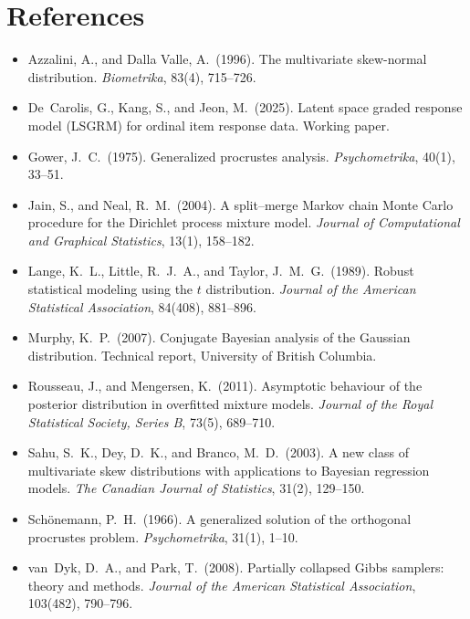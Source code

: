 \documentclass[11pt]{article}
\begin{document}
\section*{References}

\begin{itemize}[leftmargin=1.5em]
    \item Azzalini, A., and Dalla Valle, A.\ (1996).
    The multivariate skew-normal distribution.
    \emph{Biometrika}, 83(4), 715--726.

    \item De~Carolis, G., Kang, S., and Jeon, M.\ (2025).
    Latent space graded response model (LSGRM) for ordinal item response
    data.  Working paper.

    \item Gower, J.~C.\ (1975).  Generalized procrustes analysis.
    \emph{Psychometrika}, 40(1), 33--51.

    \item Jain, S., and Neal, R.~M.\ (2004).
    A split--merge Markov chain Monte Carlo procedure for the
    Dirichlet process mixture model.
    \emph{Journal of Computational and Graphical Statistics}, 13(1),
    158--182.

    \item Lange, K.~L., Little, R.~J.~A., and Taylor, J.~M.~G.\ (1989).
    Robust statistical modeling using the $t$ distribution.
    \emph{Journal of the American Statistical Association}, 84(408),
    881--896.

    \item Murphy, K.~P.\ (2007).
    Conjugate Bayesian analysis of the Gaussian distribution.
    Technical report, University of British Columbia.

    \item Rousseau, J., and Mengersen, K.\ (2011).
    Asymptotic behaviour of the posterior distribution in overfitted
    mixture models.
    \emph{Journal of the Royal Statistical Society, Series B}, 73(5),
    689--710.

    \item Sahu, S.~K., Dey, D.~K., and Branco, M.~D.\ (2003).
    A new class of multivariate skew distributions with applications to
    Bayesian regression models.
    \emph{The Canadian Journal of Statistics}, 31(2), 129--150.

    \item Sch\"onemann, P.~H.\ (1966).
    A generalized solution of the orthogonal procrustes problem.
    \emph{Psychometrika}, 31(1), 1--10.

    \item van~Dyk, D.~A., and Park, T.\ (2008).
    Partially collapsed Gibbs samplers: theory and methods.
    \emph{Journal of the American Statistical Association}, 103(482),
    790--796.
\end{itemize}
\end{document}
